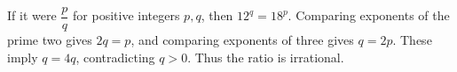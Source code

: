 If it were $\dfrac{p}{q}$ for positive integers $p,q$, then $12^q=18^p$. Comparing exponents of the prime two gives $2q=p$, and comparing exponents of three gives $q=2p$. These imply $q=4q$, contradicting $q>0$. Thus the ratio is irrational.
